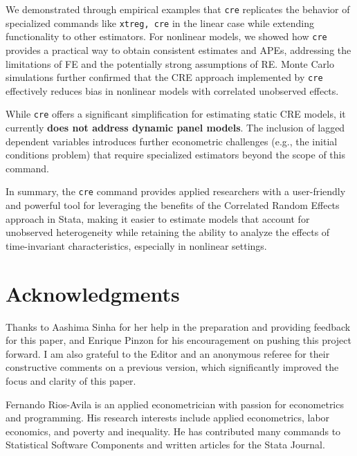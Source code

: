 \documentclass[bib]{statapress}
\begin{document}
We demonstrated through empirical examples that \texttt{cre} replicates
the behavior of specialized commands like \texttt{xtreg,\ cre} in the
linear case while extending functionality to other estimators. For
nonlinear models, we showed how \texttt{cre} provides a practical way to
obtain consistent estimates and APEs, addressing the limitations of FE
and the potentially strong assumptions of RE. Monte Carlo simulations
further confirmed that the CRE approach implemented by \texttt{cre}
effectively reduces bias in nonlinear models with correlated unobserved
effects.

While \texttt{cre} offers a significant simplification for estimating
static CRE models, it currently \textbf{does not address dynamic panel
models}. The inclusion of lagged dependent variables introduces further
econometric challenges (e.g., the initial conditions problem) that
require specialized estimators beyond the scope of this command.

In summary, the \texttt{cre} command provides applied researchers with a
user-friendly and powerful tool for leveraging the benefits of the
Correlated Random Effects approach in Stata, making it easier to
estimate models that account for unobserved heterogeneity while
retaining the ability to analyze the effects of time-invariant
characteristics, especially in nonlinear settings.

\section{Acknowledgments}\label{acknowledgments}

Thanks to Aashima Sinha for her help in the preparation and providing
feedback for this paper, and Enrique Pinzon for his encouragement on
pushing this project forward. I am also grateful to the Editor and an
anonymous referee for their constructive comments on a previous version,
which significantly improved the focus and clarity of this paper.

\clearpage





\begin{aboutauthors}

Fernando Rios-Avila is an applied econometrician with passion for
econometrics and programming. His research interests include applied
econometrics, labor economics, and poverty and inequality. He has
contributed many commands to Statistical Software Components and written
articles for the Stata Journal.

\end{aboutauthors}
\end{document}

